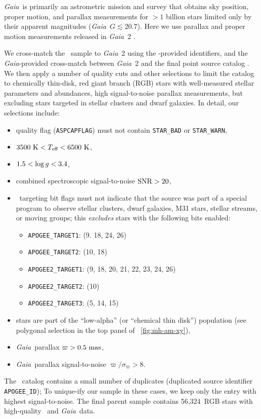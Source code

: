 \documentclass[modern]{aastex63}
\newcommand{\gaia}{\textsl{Gaia}}
\newcommand{\dr}[1]{\acronym{DR}#1}
\newcommand{\apogee}{\acronym{APOGEE}}
\newcommand{\nstars}{56,324}
\begin{document}
\gaia\ is primarily an astrometric mission and survey
\citep{Gaia-Collaboration:2016} that obtains sky position, proper motion, and
parallax measurements for $>1$ billion stars limited only by their apparent
magnitudes (\gaia\ $G \lesssim 20.7$).
Here we use parallax and proper motion measurements released in \gaia\ \dr{2}
\citep{Gaia-Collaboration:2018, Gaia-astrometric:2018}.

We cross-match the \apogee\ sample to \gaia\ \dr{2} using the \apogee-provided
 \citep{Skrutskie:2006} identifiers, and the \gaia-provided
cross-match between \gaia\ \dr{2} and the final  point source
catalog \citep{Gaia-crossmatch:2019}.
We then apply a number of quality cuts and other selections to limit the catalog
to chemically thin-disk, red giant branch (RGB) stars with well-measured stellar
parameters and abundances, high signal-to-noise parallax measurements, but
excluding stars targeted in stellar clusters and dwarf galaxies.
In detail, our selections include:
\begin{itemize}
  \item {} quality flag (\texttt{ASPCAPFLAG}) must not contain
    \texttt{STAR\_BAD} or \texttt{STAR\_WARN},
  \item $3500~\mathrm{K} < T_{\textrm{eff}} < 6500~\mathrm{K}$,
  \item $1.5 < \log g < 3.4$,
  \item combined spectroscopic signal-to-noise ${\rm SNR} > 20$,
  \item \apogee\ targeting bit flags must not indicate that the source was part
    of a special program to observe stellar clusters, dwarf galaxies, M31 stars,
    stellar streams, or moving groups; this \emph{excludes} stars with the
    following bits enabled:
    \begin{itemize}
      \item \texttt{APOGEE\_TARGET1}: (9. 18, 24, 26)
      \item \texttt{APOGEE\_TARGET2}: (10, 18)
      \item \texttt{APOGEE2\_TARGET1}: (9, 18, 20, 21, 22, 23, 24, 26)
      \item \texttt{APOGEE2\_TARGET2}: (10)
      \item \texttt{APOGEE2\_TARGET3}: (5, 14, 15)
    \end{itemize}
  \item stars are part of the ``low-alpha'' (or ``chemical thin disk'')
    population (see polygonal selection in the top panel of
    \figurename~\ref{fig:mh-am-xy}),
  \item \gaia\ parallax $\varpi > 0.5~\mathrm{mas}$,
  \item \gaia\ parallax signal-to-noise $\varpi / \sigma_\varpi > 8$.
\end{itemize}
The \apogee\ catalog contains a small number of duplicates (duplicated source
identifier \texttt{APOGEE\_ID}); To unique-ify our sample in these cases, we
keep only the entry with highest signal-to-noise.
The final parent sample contains \nstars\ RGB stars with high-quality \apogee\
and \gaia\ data.
\end{document}
